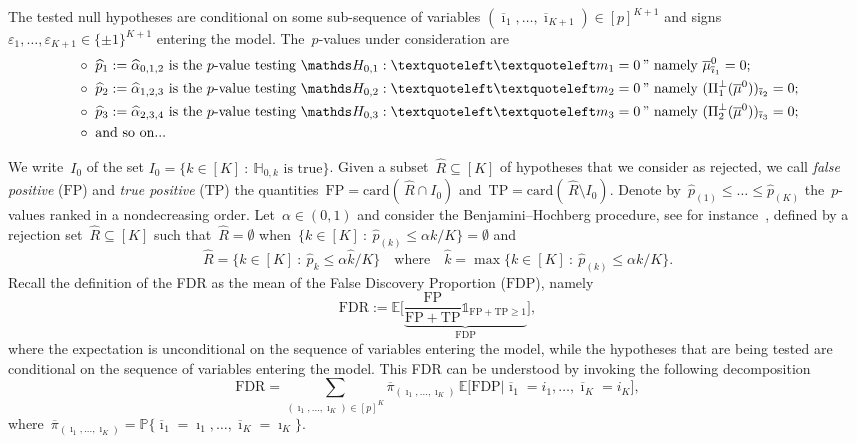 \documentclass[final,numbib]{imaiai}%
\numberwithin{equation}{section}
\renewcommand{\bar}{\overline}
\renewcommand{\hat}{\widehat}
\def\\bUnif{\text{\bUnif}}
\newcommand{\<}{\langle}
\renewcommand{\>}{\rangle}
\newcommand{\1}{\mathds{1}}
\begin{document}
{The tested null hypotheses are conditional on  some sub-sequence of variables $(\bar \imath_1,\ldots,\bar \imath_{K+1})\in[p]^{K+1}$ and signs~$\varepsilon_{1},\ldots,\varepsilon_{{K+1}}\in\{\pm1\}^{K+1}$ entering the model.
The~$p$-values under consideration are 
\begin{align}
&\circ\ \hat p_1:=\hat\alpha_{0,1,2} \mbox{ is the }p\mbox{-value testing }\mathds H_{0,1}: ‘‘m_1=0\," \mbox{ namely } \bar\mu^0_{\bar \imath_1}=0 \notag ; \\
&\circ\ \hat p_2:=\hat\alpha_{1,2,3} \mbox{ is the }p\mbox{-value testing }\mathds H_{0,2}: ‘‘m_2=0\," \mbox{ namely } (\Pi_{{1}}^\perp (\bar\mu^0))_{\bar\imath_2}=0 \notag ; \\
%
\label{e:pval}
&\circ\ \hat p_3:=\hat\alpha_{2,3,4} \mbox{ is the }p\mbox{-value testing }\mathds H_{0,3}: ‘‘m_3=0\," \mbox{ namely }  (\Pi_{{2}}^\perp (\bar\mu^0))_{\bar\imath_3}=0 ;\\
&\circ\ \mbox{and so on...} \notag
\end{align}

We write~$I_0$ of the set $I_0=\big\{k\in[K]\ :\ \mathds H_{0,k}\text{ is true}\big\}$. Given a subset~$\hat R\subseteq [K]$ of hypotheses that we consider as rejected, we call {\it false positive} ($\mathrm{FP}$) and {\it true positive} ($\mathrm{TP}$) the quantities~$\mathrm{FP}=\mathrm{card}(\,\hat R\cap I_0)$ and~$\mathrm{TP}=\mathrm{card}(\,\hat R\setminus I_0)$. Denote by~$\hat p_{(1)}\leq\ldots\leq \hat p_{(K)}$ the~$p$-values ranked in a nondecreasing order.
Let~$\alpha\in(0,1)$ and consider the Benjamini--Hochberg procedure, see for instance~\cite{benjamini1995controlling}, defined by a rejection set~$\hat R\subseteq[K]$ such that~$\hat R=\emptyset$ when~$\{k\in[K]\ :\ \hat p_{(k)}\leq\alpha k/K\}=\emptyset$ and 
\begin{equation}\label{e:rchap}
\hat R=\{k\in[K]\ :\ \hat p_k\leq \alpha\hat k/K\}\quad\mathrm{where}\quad \hat k=\max\big\{k\in[K]\ :\ \hat p_{(k)}\leq\alpha k/K\big\}.
\end{equation}
Recall the definition of the FDR as the mean of the False Discovery Proportion ($\mathrm{FDP}$), namely
\[
\mathrm{FDR}:=\mathds E\Big[\underbrace{\frac{\mathrm{FP}}{\mathrm{FP}+\mathrm{TP}}\mathds 1_{\mathrm{FP}+\mathrm{TP}\geq1}}_{\mathrm{FDP}}\Big],
\]
where the expectation is unconditional on the sequence of variables entering the model, while the hypotheses that are being tested are conditional on the  sequence of variables entering the model.
This FDR can be understood by invoking the following decomposition
\[
\mathrm{FDR}=\sum_{(\imath_1,\ldots,\imath_K)\in[p]^K}
\!\!\!\!\!\!
\bar\pi_{ (\imath_1,\ldots, \imath_K)}\,\mathds E\big[\mathrm{FDP}|\bar\imath_1=i_1,\ldots,\bar\imath_K=i_K\big],
\]
where~$\bar\pi_{ (\imath_1,\ldots, \imath_K)}=\mathds P\big\{\bar \imath_1=\imath_1,\ldots, \bar \imath_K=\imath_K\big\}$.

}
\end{document}
